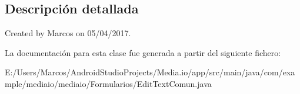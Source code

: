 \subsection{Descripción detallada}
Created by Marcos on 05/04/2017. 

La documentación para esta clase fue generada a partir del siguiente fichero\+:\begin{DoxyCompactItemize}
\item 
E\+:/\+Users/\+Marcos/\+Android\+Studio\+Projects/\+Media.\+io/app/src/main/java/com/example/mediaio/mediaio/\+Formularios/Edit\+Text\+Comun.\+java\end{DoxyCompactItemize}
